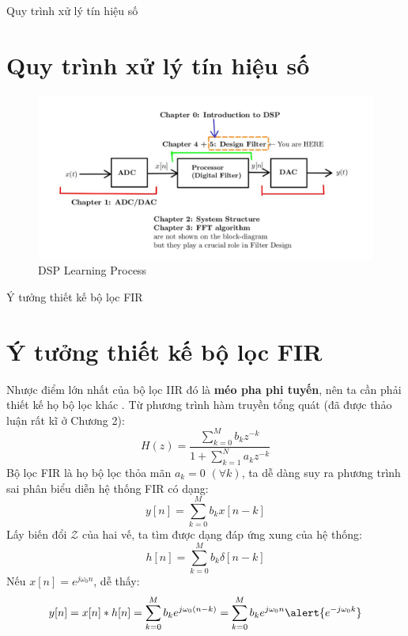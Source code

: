 \documentclass[8pt]{beamer}
\begin{document}
\begin{frame}{Quy trình xử lý tín hiệu số}
	\section{Quy trình xử lý tín hiệu số}
	\begin{figure}[h]
		\includegraphics[width=1.1\textwidth]{1.jpg}
		\caption{DSP Learning Process}			\label{fig:re1}
	\end{figure}

\end{frame}
\begin{frame}{Ý tưởng thiết kế bộ lọc FIR}
	\section{Ý tưởng thiết kế bộ lọc FIR}
	Nhược điểm lớn nhất của bộ lọc IIR đó là \textbf{méo pha phi tuyến}, nên ta cần phải thiết kế họ bộ lọc khác . Từ phương trình hàm truyền tổng quát (đã được thảo luận rất kĩ ở \alert{Chương 2}):
	$$H(z)=\frac{\sum_{k=0}^M b_{k}z^{-k}}{1+\sum_{k=1}^{N}a_{k}z^{-k}}$$
	Bộ lọc FIR là họ bộ lọc thỏa mãn $a_{k}=0$ $(\forall k)$, ta dễ dàng suy ra phương trình sai phân biểu diễn hệ thống FIR có dạng:
	$$y[n]=\sum_{k=0}^{M}b_{k}x[n-k]$$
	Lấy biến đổi $\mathscr{Z}$ của hai vế, ta tìm được dạng đáp ứng xung của hệ thống:
	$$h[n]=\sum_{k=0}^{M}b_{k}\delta[n-k]$$
	Nếu $x[n]=e^{j\omega_{0}n}$, dễ thấy:
	$$y[n]=x[n]*h[n]=\sum_{k=0}^{M}b_{k}e^{j\omega_{0}(n-k)}=\sum_{k=0}^M b_{k}e^{j\omega_{0}n}\alert{e^{-j\omega_{0}k}}$$
\end{frame}
\end{document}
